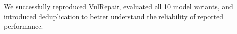 We successfully reproduced VulRepair, evaluated all 10 model variants, and introduced deduplication to better understand the reliability of reported performance.
